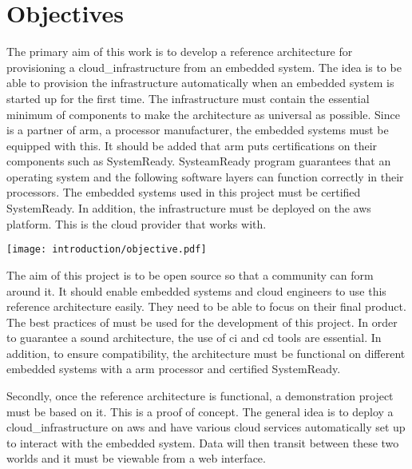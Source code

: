 \section{Objectives}

The primary aim of this work is to develop a reference architecture for \gls{provisioning} a \gls{cloud_infrastructure} from an embedded system. The idea is to be able to provision the infrastructure automatically when an embedded system is started up for the first time. The infrastructure must contain the essential minimum of components to make the architecture as universal as possible. Since  is a partner of \gls{arm}, a processor manufacturer, the embedded systems must be equipped with this. It should be added that \gls{arm} puts certifications on their components such as SystemReady. SysteamReady program guarantees that an operating system and the following software layers can function correctly in their processors. The embedded systems used in this project must be certified SystemReady. In addition, the infrastructure must be deployed on the \gls{aws} platform. This is the \gls{cloud} provider that  works with.
\begin{center}
    \begingroup
    \texttt{[image: introduction/objective.pdf]}
    \label{fig:objective}
    \endgroup
\end{center}
The aim of this project is to be open source so that a community can form around it. It should enable embedded systems and \gls{cloud} engineers to use this reference architecture easily. They need to be able to focus on their final product. The best practices of  must be used for the development of this project. In order to guarantee a sound architecture, the use of \acrfull{ci} and \acrfull{cd} tools are essential. In addition, to ensure compatibility, the architecture must be functional on different embedded systems with a \gls{arm} processor and certified SystemReady.

Secondly, once the reference architecture is functional, a demonstration project must be based on it. This is a proof of concept. The general idea is to deploy a \gls{cloud_infrastructure} on \gls{aws} and have various \gls{cloud} services automatically set up to interact with the embedded system. Data will then transit between these two worlds and it must be viewable from a web interface.


